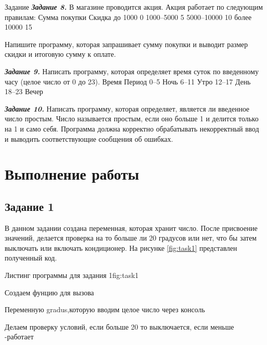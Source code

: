 \documentclass{vvsu}
\begin{document}
\begin{addition}{Задание}
    \textit{\textbf{Задание 8.}}
    В магазине проводится акция. Акция работает по следующим правилам:
    Сумма покупки 	Скидка
    до 1000 	0%
    1000–5000 	5%
    5000–10000 	10%
    более 10000 	15%

    Напишите программу, которая запрашивает сумму покупки и выводит размер скидки и итоговую сумму к оплате.

    \textit{\textbf{Задание 9.}}
    Написать программу, которая определяет время суток по введенному часу (целое число от 0 до 23).
    Время 	Период
    0–5 	Ночь
    6–11 	Утро
    12–17 	День
    18–23 	Вечер

    \textit{\textbf{Задание 10.}}
    Написать программу, которая определяет, является ли введенное число простым. Число называется простым, если оно больше 1 и делится только на 1 и само себя. Программа должна корректно обрабатывать некорректный ввод и выводить соответствующие сообщения об ошибках.

\end{addition}
\toc

\section{Выполнение работы}


\subsection{Задание 1}
В данном задании создана переменная, которая хранит число. После присвоение значений, делается проверка на то больше ли 20 градусов или нет, что бы затем выключать или включать кондиционер. На рисунке \ref{fig:task1} представлен полученный код.

\begin{vvsu_figure}{Листинг программы для задания 1}{fig:task1}
    \begin{minipage}{.75\textwidth}
        
    \end{minipage}
\end{vvsu_figure}

\begin{vvsu_list}
    \item Создаем фунцию для вызова
    \item Переменную gradus,которую вводим целое число через консоль
    \item Делаем проверку условий, если больше 20 то выключается, если меньше -работает 
\end{vvsu_list}
\end{document}
